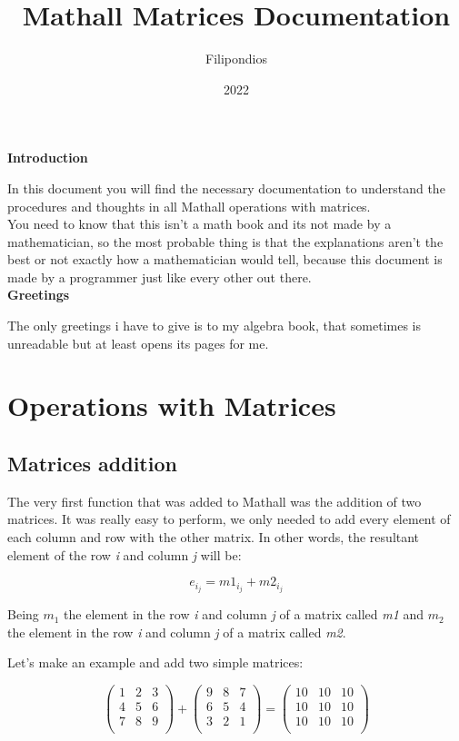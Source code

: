 \documentclass{article}
\title{\textbf{Mathall Matrices Documentation}}
\author{Filipondios}
\date{2022}
\begin{document}
\maketitle
\newpage

\textbf{Introduction}

In this document you will find the necessary documentation to understand the procedures and
thoughts in all Mathall operations with matrices.\\

You need to know that this isn't a math book and its not made by a mathematician, so the most
probable thing is that the explanations aren't the best or not exactly how a mathematician would
tell, because this document is made by a programmer just like every other out there.\\

\textbf{Greetings}

The only greetings i have to give is to my algebra book, that sometimes is unreadable but at least
opens its pages for me.

\newpage 

\section{Operations with Matrices}
\subsection{Matrices addition}

The very first function that was added to Mathall was the addition of two matrices. It was really
easy to perform, we only needed to add every element of each column and row with the other matrix.
In other words, the resultant element of the row \textit{i} and column \textit{j} will be:

\[ e_{i_j} = m1_{i_j} + m2_{i_j} \]

Being $m_1$ the element in the row \textit{i} and column \textit{j} of a matrix called \textit{m1}
and $m_2$ the element in the row \textit{i} and column \textit{j} of a matrix called \textit{m2}.

Let's make an example and add two simple matrices:

\[
\begin{pmatrix}
    1 & 2 & 3 \\
    4 & 5 & 6 \\
    7 & 8 & 9 \\
\end{pmatrix}
  + 
\begin{pmatrix}
    9 & 8 & 7 \\
    6 & 5 & 4 \\
    3 & 2 & 1 \\
\end{pmatrix}
=
\begin{pmatrix}
    10 & 10 & 10 \\
    10 & 10 & 10 \\
    10 & 10 & 10 \\
\end{pmatrix}
\]
\end{document}
